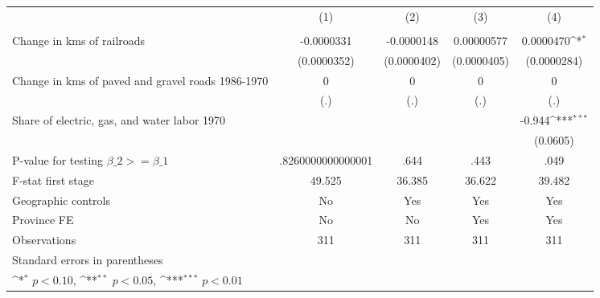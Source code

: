 {
\def\sym#1{\ifmmode^{#1}\else\(^{#1}\)\fi}
\begin{tabular}{l*{4}{c}}
\hline\hline
                &\multicolumn{1}{c}{(1)}&\multicolumn{1}{c}{(2)}&\multicolumn{1}{c}{(3)}&\multicolumn{1}{c}{(4)}\\
                &\multicolumn{1}{c}{}&\multicolumn{1}{c}{}&\multicolumn{1}{c}{}&\multicolumn{1}{c}{}\\
\hline
Change in kms of railroads&-0.0000331         &-0.0000148         &0.00000577         &0.0000470\sym{*}  \\
                &(0.0000352)         &(0.0000402)         &(0.0000405)         &(0.0000284)         \\
[1em]
Change in kms of paved and gravel roads 1986-1970&        0         &        0         &        0         &        0         \\
                &      (.)         &      (.)         &      (.)         &      (.)         \\
[1em]
Share of electric, gas, and water labor 1970&                  &                  &                  &   -0.944\sym{***}\\
                &                  &                  &                  & (0.0605)         \\
\hline
P-value for testing $\beta\_{2} >= \beta\_{1}$&.8260000000000001         &     .644         &     .443         &     .049         \\
F-stat first stage&   49.525         &   36.385         &   36.622         &   39.482         \\
Geographic controls&       No         &      Yes         &      Yes         &      Yes         \\
Province FE     &       No         &       No         &      Yes         &      Yes         \\
Observations    &      311         &      311         &      311         &      311         \\
\hline\hline
\multicolumn{5}{l}{\footnotesize Standard errors in parentheses}\\
\multicolumn{5}{l}{\footnotesize \sym{*} \(p<0.10\), \sym{**} \(p<0.05\), \sym{***} \(p<0.01\)}\\
\end{tabular}
}
